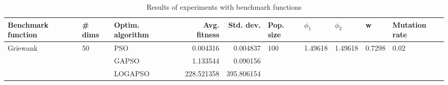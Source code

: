 \begin{table}
\centering
\caption{Results of experiments with benchmark functions}
\begin{tabular}{lllrrlllll}
\toprule
       Benchmark function &             \# dims & Optim. algorithm &  Avg. fitness &  Std. dev. &            Pop. size &               $\phi_{1}$ &               $\phi_{2}$ &                       w &         Mutation rate \\
\midrule
\multirow{3}{*}{Griewank} & \multirow{3}{*}{50} &              PSO &      0.004316 &   0.004837 & \multirow{3}{*}{100} & \multirow{3}{*}{1.49618} & \multirow{3}{*}{1.49618} & \multirow{3}{*}{0.7298} & \multirow{3}{*}{0.02} \\
                          &                     &            GAPSO &      1.133544 &   0.090156 &                      &                          &                          &                         &                       \\
                          &                     &          LOGAPSO &    228.521358 & 395.806154 &                      &                          &                          &                         &                       \\
\bottomrule
\end{tabular}
\end{table}
